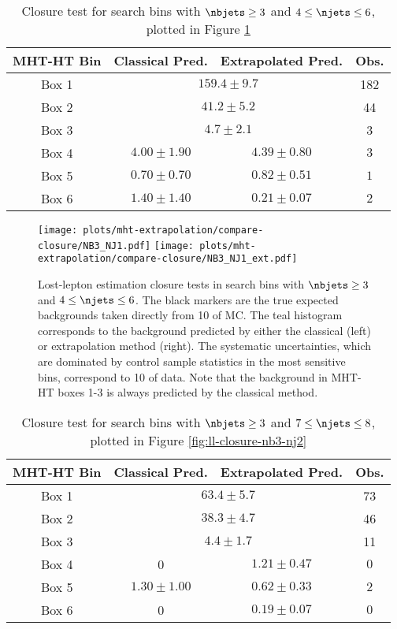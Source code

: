 \begin{table}[h]\centering
  \caption{Closure test for search bins with $\nbjets\geq3$ and $4\leq\njets\leq6$, plotted in Figure \ref{fig:ll-closure-nb3-nj1}}
  \begin{tabular}{|c|c|c|c|}
    \hline
    MHT-HT Bin & Classical Pred. & Extrapolated Pred. & Obs.  \\ \hline
Box 1 & \multicolumn{2}{c|}{$159.4\pm9.7$} & 182 \\
Box 2 & \multicolumn{2}{c|}{$41.2\pm5.2$} &  44 \\
Box 3 & \multicolumn{2}{c|}{$4.7\pm2.1$} &   3 \\
\hline
Box 4 & $4.00\pm1.90$ & $4.39\pm0.80$ & $  3$ \\
Box 5 & $0.70\pm0.70$ & $0.82\pm0.51$ & $  1$ \\
Box 6 & $1.40\pm1.40$ & $0.21\pm0.07$ & $  2$ \\
    \hline  \end{tabular}
    \label{tab:ll-closure-nb3-nj1}
\end{table}


\begin{figure}
  \begin{center}
    \texttt{[image: plots/mht-extrapolation/compare-closure/NB3\_NJ1.pdf]} 
    \texttt{[image: plots/mht-extrapolation/compare-closure/NB3\_NJ1\_ext.pdf]}
  \caption{
      Lost-lepton estimation closure tests in search bins with $\nbjets\geq3$ and $4\leq\njets\leq6$.  The black markers are the true expected backgrounds taken directly from 10 \fbinv of \ttbar MC.  The teal histogram corresponds to the background predicted by either the classical (left) or extrapolation method (right).  The systematic uncertainties, which are dominated by control sample statistics in the most sensitive bins, correspond to 10 \invfb of data.  Note that the background in MHT-HT boxes 1-3 is always predicted by the classical method.
    }
    \label{fig:ll-closure-nb3-nj1}
  \end{center}
\end{figure}
\clearpage



\begin{table}[h]\centering
  \caption{Closure test for search bins with $\nbjets\geq3$ and $7\leq\njets\leq8$, plotted in Figure \ref{fig:ll-closure-nb3-nj2}}
  \begin{tabular}{|c|c|c|c|}
    \hline
    MHT-HT Bin & Classical Pred. & Extrapolated Pred. & Obs.  \\ \hline
Box 1 & \multicolumn{2}{c|}{$63.4\pm5.7$} &  73 \\
Box 2 & \multicolumn{2}{c|}{$38.3\pm4.7$} &  46 \\
Box 3 & \multicolumn{2}{c|}{$4.4\pm1.7$} &  11 \\
\hline
Box 4 & 0 & $1.21\pm0.47$ & $  0$ \\
Box 5 & $1.30\pm1.00$ & $0.62\pm0.33$ & $  2$  \\
Box 6 & 0 & $0.19\pm0.07$ & $  0$ \\
    \hline  \end{tabular}
    \label{tab:ll-closure-nb3-nj2}
\end{table}

